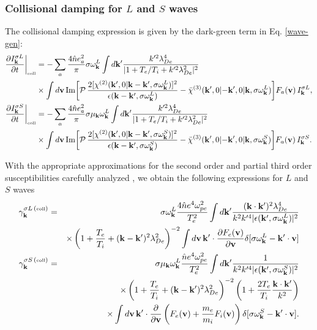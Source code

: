 \documentclass[12pt,a4paper,ruledheader]{report}
\begin{document}
\subsubsection{Collisional damping for $L$ and $S$ waves}
The collisional damping expression is given by the dark-green
term in Eq. \eqref{wave-gen}:
\begin{equation}
  \label{CD}
  \begin{split}
  \frac{\partial I_{\bf k}^{\sigma L}}{\partial t}\biggr|_{\mbox{\tiny coll}}
    &=-\sum_a \frac{4\hat n e_a^2}{\pi}\sigma \omega_{\bf k}^L
    \int d{\bf k '} \frac{k'^2\lambda_{De}^4}{|1+T_e/T_i+k'^2\lambda_{De}^2|^2}\\
    &\times \int d{\bf v}\,\mbox{Im}\biggl[ \mathcal{P}\,
    \frac{2[\chi^{(2)}({\bf k'},0|{\bf k-k'},\sigma\omega_{\bf k}^L)]^2}
    {\epsilon({\bf k-k'},\sigma \omega_{\bf k}^L)}
    -\bar \chi^{(3)}({\bf k'},0|{\bf -k'},0|{\bf k},\sigma\omega_{\bf k}^L)\biggr]
    F_a({\bf v})\,I_{\bf k}^{\sigma L},\\
   \frac{\partial I_{\bf k}^{\sigma S}}{\partial t}\biggr|_{\mbox{\tiny coll}}
    &=-\sum_a \frac{4\hat n e_a^2}{\pi}\sigma \mu_{\bf k} \omega_{\bf k}^L
    \int d{\bf k '} \frac{k'^2\lambda_{De}^4}{|1+T_e/T_i+k'^2\lambda_{De}^2|^2}\\
    &\times\int d{\bf v}\,\mbox{Im}\biggl[ \mathcal{P}\,
    \frac{2[\chi^{(2)}({\bf k'},0|{\bf k-k'},
      \sigma\omega_{\bf k}^S)]^2}
    {\epsilon({\bf k-k'},\sigma \omega_{\bf k}^S)}
    -\bar \chi^{(3)}({\bf k'},0|{\bf -k'},0|{\bf k},\sigma\omega_{\bf k}^S)\biggr]
    F_a({\bf v})\,I_{\bf k}^{\sigma S}.
  \end{split}
\end{equation}

With the appropriate approximations for the second order and partial
third order susceptibilities carefully analyzed \cite{YZKS16}, we 
obtain the following expressions for $L$ and $S$ waves
\begin{eqnarray}
  \label{gammaL}
\gamma_{\bf k}^{\sigma L\,(\mbox{\tiny coll})}
  &=& \sigma \omega_{\bf k}^L
\frac{4\hat{n}e^4\omega_{pe}^2}{T_e^2}\int d{\bf k}'
\frac{({\bf k}\cdot {\bf k'})^2\lambda_{De}^4}{k^2k'^4 
      |\epsilon({\bf k'},\sigma\omega_{\bf k}^L)|^2}\\
&&\times \left(1+\frac{T_e}{T_i}+({\bf k}-{\bf k'})^2\lambda_{De}^2\right)^{-2}
\int d{\bf v}\, {\bf k'}\cdot \frac{\partial F_e({\bf v})}{\partial {\bf v}}
\delta [\sigma\omega_{\bf k}^L-{\bf k'}\cdot{\bf v}]\nonumber\\
\gamma_{\bf k}^{\sigma S\, (\mbox{\tiny coll})}
  &=& \sigma \mu_{\bf k}\omega_{\bf k}^L
\frac{\hat{n}e^4\omega_{pe}^2}{T_e^2}\int d{\bf k}'
\frac{1}{k^2k'^4 |\epsilon({\bf k'},\sigma\omega_{\bf k}^S)|^2}\nonumber\\
&&\times \left(1+\frac{T_e}{T_i}+({\bf k}-{\bf k'})^2\lambda_{De}^2\right)^{-2}
   \left(1+\frac{2T_e}{T_i}\frac{{\bf k}\cdot{\bf k}'}{k^2}\right)
   \label{gammaS}\\
&&\times \int d{\bf v}\, {\bf k'}\cdot \frac{\partial}{\partial{\bf v}}
\left(F_e({\bf v})+\frac{m_e}{m_i}F_i({\bf v})\right)
\delta [\sigma\omega_{\bf k}^S-{\bf k'}\cdot{\bf v}].\nonumber
\end{eqnarray}
\end{document}
